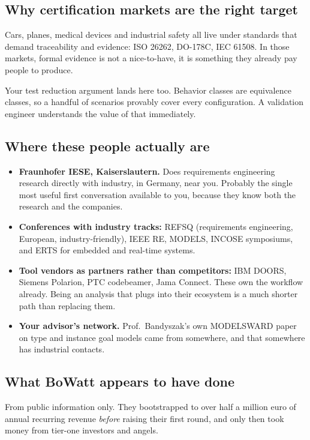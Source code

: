 \documentclass[11pt,a4paper]{article}
\begin{document}
\subsection{Why certification markets are the right target}

Cars, planes, medical devices and industrial safety all live under standards that demand
traceability and evidence: ISO 26262, DO-178C, IEC 61508. In those markets, formal
evidence is not a nice-to-have, it is something they already pay people to produce.

Your test reduction argument lands here too. Behavior classes are equivalence classes,
so a handful of scenarios provably cover every configuration. A validation engineer
understands the value of that immediately.

\subsection{Where these people actually are}

\begin{itemize}
\item \textbf{Fraunhofer IESE, Kaiserslautern.} Does requirements engineering research
      directly with industry, in Germany, near you. Probably the single most useful
      first conversation available to you, because they know both the research and the
      companies.
\item \textbf{Conferences with industry tracks:} REFSQ (requirements engineering,
      European, industry-friendly), IEEE RE, MODELS, INCOSE symposiums, and ERTS for
      embedded and real-time systems.
\item \textbf{Tool vendors as partners rather than competitors:} IBM DOORS, Siemens
      Polarion, PTC codebeamer, Jama Connect. These own the workflow already. Being an
      analysis that plugs into their ecosystem is a much shorter path than replacing
      them.
\item \textbf{Your advisor's network.} Prof.\ Bandyszak's own MODELSWARD paper on
      type and instance goal models came from somewhere, and that somewhere has
      industrial contacts.
\end{itemize}

\subsection{What BoWatt appears to have done}

From public information only. They bootstrapped to over half a million euro of annual
recurring revenue \emph{before} raising their first round, and only then took money from
tier-one investors and angels.
\end{document}
